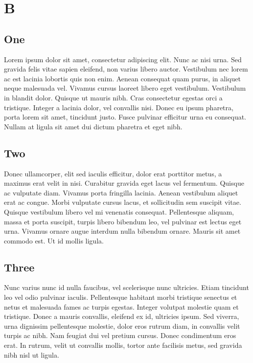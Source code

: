\chapter{B}

\section{One}
Lorem ipsum dolor sit amet, consectetur adipiscing elit. Nunc ac nisi urna. Sed gravida felis vitae sapien eleifend, non varius libero auctor. Vestibulum nec lorem ac est lacinia lobortis quis non enim. Aenean consequat quam purus, in aliquet neque malesuada vel. Vivamus cursus laoreet libero eget vestibulum. Vestibulum in blandit dolor. Quisque ut mauris nibh. Cras consectetur egestas orci a tristique. Integer a lacinia dolor, vel convallis nisi. Donec eu ipsum pharetra, porta lorem sit amet, tincidunt justo. Fusce pulvinar efficitur urna eu consequat. Nullam at ligula sit amet dui dictum pharetra et eget nibh.

\section{Two}
Donec ullamcorper, elit sed iaculis efficitur, dolor erat porttitor metus, a maximus erat velit in nisi. Curabitur gravida eget lacus vel fermentum. Quisque ac vulputate diam. Vivamus porta fringilla lacinia. Aenean vestibulum aliquet erat ac congue. Morbi vulputate cursus lacus, et sollicitudin sem suscipit vitae. Quisque vestibulum libero vel mi venenatis consequat. Pellentesque aliquam, massa et porta suscipit, turpis libero bibendum leo, vel pulvinar est lectus eget urna. Vivamus ornare augue interdum nulla bibendum ornare. Mauris sit amet commodo est. Ut id mollis ligula.

\section{Three}
Nunc varius nunc id nulla faucibus, vel scelerisque nunc ultricies. Etiam tincidunt leo vel odio pulvinar iaculis. Pellentesque habitant morbi tristique senectus et netus et malesuada fames ac turpis egestas. Integer volutpat molestie quam et tristique. Donec a mauris convallis, eleifend ex id, ultricies ipsum. Sed viverra, urna dignissim pellentesque molestie, dolor eros rutrum diam, in convallis velit turpis ac nibh. Nam feugiat dui vel pretium cursus. Donec condimentum eros erat. In rutrum, velit ut convallis mollis, tortor ante facilisis metus, sed gravida nibh nisl ut ligula.

